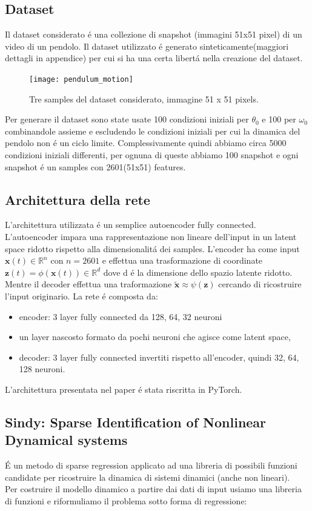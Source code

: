 \documentclass[11pt]{article}
\begin{document}
\subsection{Dataset}
Il dataset considerato é una collezione di snapshot (immagini 51x51 pixel) di un video di un pendolo.
Il dataset utilizzato é generato sinteticamente(maggiori dettagli in appendice) per cui si ha una certa libertá nella creazione del dataset.\\
\begin{figure}[h]
\caption{Tre samples del dataset considerato, immagine 51 x 51 pixels.}
\centering
\texttt{[image: pendulum\_motion]}
\end{figure}%
Per generare il dataset sono state usate 100 condizioni iniziali per $\theta_0$ e 100 per $\omega_0$ combinandole assieme e escludendo le condizioni iniziali per cui la dinamica del pendolo non é un ciclo limite. Complessivamente quindi abbiamo circa 5000 condizioni iniziali differenti, per ognuna di queste abbiamo 100 snapshot e ogni snapshot é un samples con 2601(51x51) features.


\newpage
\subsection{Architettura della rete}
L'architettura utilizzata é un semplice autoencoder fully connected. L'autoencoder impara una rappresentazione non lineare dell'input in un latent space ridotto rispetto alla dimensionalitá dei samples.
L'encoder ha come input $\mathbf{x}(t) \in \mathbb{R}^n $ con $n = 2601$ e effettua una trasformazione di coordinate $\mathbf{z}(t)=\phi(\mathbf{x}(t)) \in \mathbb{R}^d$ dove d é la dimensione dello spazio latente ridotto. Mentre il decoder effettua una traformazione $\tilde{\mathbf{x}} \approx \psi(\mathbf{z})$ cercando di ricostruire l'input originario.
La rete é composta da:
\begin{itemize}
\item encoder: 3 layer fully connected da 128, 64, 32 neuroni
\item un layer nascosto formato da pochi neuroni che agisce come latent space, \item decoder: 3 layer fully connected invertiti rispetto all'encoder, quindi 32, 64, 128 neuroni.
\end{itemize}
L'architettura presentata nel paper é stata riscritta in PyTorch. \cite{pytorch}


\subsection{Sindy: Sparse Identification of Nonlinear Dynamical systems}
É un metodo di sparse regression applicato ad una libreria di possibili funzioni candidate per ricostruire la dinamica di sistemi dinamici (anche non lineari). \cite{pysindy} \\
Per costruire il modello dinamico a partire dai dati di input usiamo una libreria di funzioni e riformuliamo il problema sotto forma di regressione:
\end{document}

